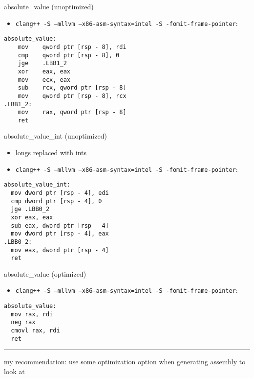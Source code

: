 \begin{frame}[fragile,label=absValueIntelUnopt]{absolute\_value (unoptimized)}
\lstset{
    language=myasm
}
\begin{itemize}
    \item \texttt{clang++ -S --mllvm --x86-asm-syntax=intel -S -fomit-frame-pointer}:
\end{itemize}
\begin{lstlisting}
absolute_value:
    mov    qword ptr [rsp - 8], rdi
    cmp    qword ptr [rsp - 8], 0
    jge    .LBB1_2
    xor    eax, eax
    mov    ecx, eax
    sub    rcx, qword ptr [rsp - 8]
    mov    qword ptr [rsp - 8], rcx
.LBB1_2:
    mov    rax, qword ptr [rsp - 8]
    ret
\end{lstlisting}
\end{frame}
\begin{frame}[fragile,label=absValueInt]{absolute\_value\_int (unoptimized)}
\lstset{
    language=myasm
}
\begin{itemize}
    \item longs replaced with ints
    \item \texttt{clang++ -S --mllvm --x86-asm-syntax=intel -S -fomit-frame-pointer}:
\end{itemize}
\begin{lstlisting}
absolute_value_int:
  mov dword ptr [rsp - 4], edi
  cmp dword ptr [rsp - 4], 0
  jge .LBB0_2
  xor eax, eax
  sub eax, dword ptr [rsp - 4]
  mov dword ptr [rsp - 4], eax
.LBB0_2:
  mov eax, dword ptr [rsp - 4]
  ret
\end{lstlisting}
\end{frame}



\begin{frame}[fragile,label=absValueO2]{absolute\_value (optimized)}
\lstset{
    language=myasm
}
\begin{itemize}
    \item \texttt{clang++ -S  --mllvm --x86-asm-syntax=intel -S -fomit-frame-pointer}:
\end{itemize}
\begin{lstlisting}
absolute_value:
  mov rax, rdi
  neg rax
  cmovl rax, rdi
  ret
\end{lstlisting}
\hrule
my recommendation: use some optimization option when generating assembly to look at
\end{frame}
